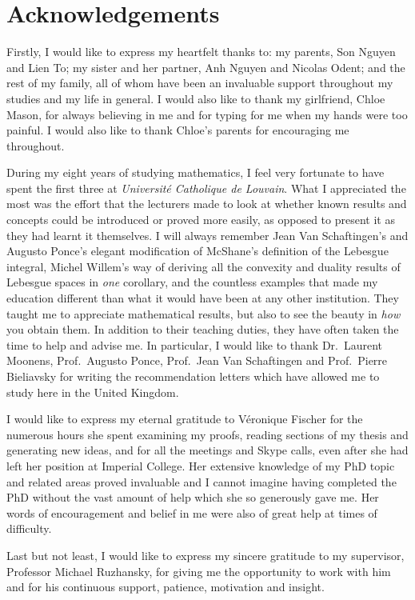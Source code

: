 \chapter*{Acknowledgements}

Firstly, I would like to express my heartfelt thanks to:
my parents, Son Nguyen and Lien To; my sister and her partner, Anh Nguyen and Nicolas Odent; and the rest of my family,
all of whom have been an invaluable support throughout my studies and my life in general.
I would also like to thank my girlfriend, Chloe Mason,
for always believing in me and for typing for me when my hands were too painful.
I would also like to thank Chloe's parents for encouraging me throughout.

During my eight years of studying mathematics,
I feel very fortunate to have spent the first three at \emph{Universit\'e Catholique de Louvain}.
What I appreciated the most was the effort that the lecturers made to look at
whether known results and concepts could be introduced or proved more easily,
as opposed to present it as they had learnt it themselves.
I will always remember Jean Van Schaftingen's and Augusto Ponce's elegant modification of McShane's definition of the Lebesgue integral,
Michel Willem's way of deriving all the convexity and duality results of Lebesgue spaces in \emph{one} corollary,
and the countless examples that made my education different than what it would have been at any other institution.
They taught me to appreciate mathematical results,
but also to see the beauty in \emph{how} you obtain them.
In addition to their teaching duties,
they have often taken the time to help and advise me.
In particular,
I would like to thank Dr.\ Laurent Moonens,
Prof.\ Augusto Ponce, Prof.\ Jean Van Schaftingen and Prof.\ Pierre Bieliavsky for writing the recommendation letters which have allowed me to study here in the United Kingdom.

I would like to express my eternal gratitude to V\'eronique Fischer for the numerous hours she spent examining my proofs,
reading sections of my thesis and generating new ideas,
and for all the meetings and Skype calls,
even after she had left her position at Imperial College.
Her extensive knowledge of my PhD topic and related areas proved invaluable and
I cannot imagine having completed the PhD without the vast amount of help which she so generously gave me.
Her words of encouragement and belief in me were also of great help at times of difficulty.

Last but not least,
I would like to express my sincere gratitude to my supervisor,
Professor Michael Ruzhansky,
for giving me the opportunity to work with him and for his continuous support, patience, motivation and insight.

